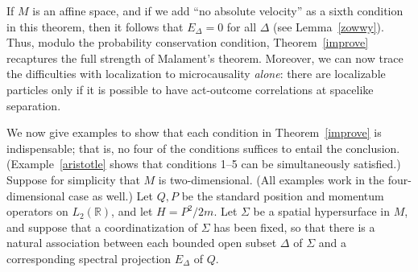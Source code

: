 \documentclass[12pt]{article}
\theoremstyle{remark}
\begin{document}
If $M$ is an affine space, and if we add ``no absolute velocity'' as a
sixth condition in this theorem, then it follows that $E_{\Delta}=0$
for all $\Delta$ (see Lemma~\ref{zowwy}).  Thus, modulo the
probability conservation condition, Theorem~\ref{improve} recaptures
the full strength of Malament's theorem.  Moreover, we can now trace
the difficulties with localization to microcausality \emph{alone}:
there are localizable particles only if it is possible to have
act-outcome correlations at spacelike separation.

We now give examples to show that each condition in
Theorem~\ref{improve} is indispensable; that is, no four of the
conditions suffices to entail the conclusion.
(Example~\ref{aristotle} shows that conditions 1--5 can be
simultaneously satisfied.)  Suppose for simplicity that $M$ is
two-dimensional.  (All examples work in the four-dimensional case as
well.)  Let $Q,P$ be the standard position and momentum operators on
$L_{2}(\mathbb{R})$, and let $H=P^{2}/2m$.  Let $\Sigma$ be a spatial
hypersurface in $M$, and suppose that a coordinatization of $\Sigma$
has been fixed, so that there is a natural association between each
bounded open subset $\Delta$ of $\Sigma$ and a corresponding spectral
projection $E_{\Delta}$ of $Q$.
\end{document}
